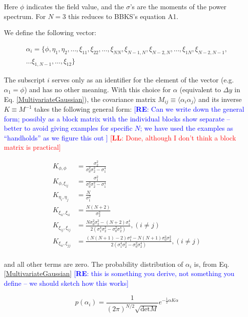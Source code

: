 \documentclass[12pt]{article}
\newcommand{\re}[1]{\textcolor{blue}{[{\bf RE}: #1]}}
\newcommand{\lfl}[1]{\textcolor{red}{[{\bf LL}: #1]}}
\begin{document}
\noindent Here $\phi$ indicates the field value, and the $\sigma$'s are the moments of the power spectrum. For $N=3$ this reduces to BBKS's equation A1. 

We define the following vector:

\begin{equation}
\begin{split}
\alpha_i = \{\phi,\eta_1,\eta_2,\ldots,\xi_{11},\xi_{22},\ldots,\xi_{NN},\xi_{N-1,N},\xi_{N-2,N},\ldots,\xi_{1N},\xi_{N-2,N-1},\\
\ldots\xi_{1,N-1},\ldots,\xi_{12}\}
\end{split}
\end{equation}

\noindent The subscript $i$ serves only as an identifier for the element of the vector (e.g. $\alpha_1 = \phi$) and has no other meaning. With this choice for $\alpha$ (equivalent to $\Delta y$ in Eq. \ref{MultivariateGaussian}), the covariance matrix $M_{ij}\equiv\langle\alpha_i\alpha_j\rangle$ and its inverse $K \equiv M^{-1}$ takes the following general form: \re{Can we write down the general form; possibly as a block matrix with the individual blocks show separate -- better to avoid giving examples for specific $N$; we have used the examples as ``handholds'' as we figure this out } \lfl{Done, although I don't think a block matrix is practical}

\begin{align*}
K_{\phi, \phi} &= \frac{\sigma_2^2}{\sigma_0^2\sigma_2^2-\sigma_1^4} \\
K_{\phi, \xi_{ij}} &= \frac{\sigma_1^2}{\sigma_0^2\sigma_2^2-\sigma_1^4} \\
K_{\eta_i,\eta_j} &= \frac{N}{\sigma_1^2}\\
K_{\xi_{ii},\xi_{ii}} &=  \frac{N(N+2)}{\sigma_2^2} \\
K_{\xi_{ij}, \xi_{ij}} &= \frac{N\sigma_0^2\sigma_2^2-(N+2)\sigma_1^4}{2(\sigma_1^4\sigma_2^2-\sigma_0^2\sigma_2^4)}, (i\neq j)\\
K_{\xi_{ii}, \xi_{jj}} &= \frac{(N(N+1)-2)\sigma_1^4 - N(N+1)\sigma_0^2\sigma_2^2}{2(\sigma_1^4\sigma_2^2-\sigma_0^2\sigma_2^4)}, (i \neq j)\\
\end{align*}

\noindent and all other terms are zero. The probability distribution of $\alpha_i$ is, from Eq. \ref{MultivariateGaussian} \re{this is something you derive, not something you define -- we should sketch how this works}

\begin{equation} \label{ProbDistrib}
p(\alpha_i)=\frac{1}{(2\pi)^{N/2}\sqrt{\mathrm{det}M}} e^{-\frac{1}{2}\alpha K \alpha}
\end{equation}
\end{document}

